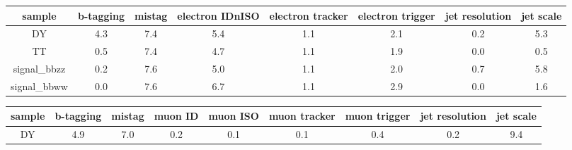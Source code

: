 




\begin{sidewaystable}
\begin{center}
\caption{Yield variations, ee channel, 300 GeV.}
\begin{tabular}{ | c | c | c | c | c | c |c | c | } \hline
 sample & b-tagging &  mistag &  electron IDnISO &  electron tracker &  electron trigger &  jet resolution &  jet scale \\\hline
  DY &              4.3 &     7.4 &              5.4 &               1.1 &               2.1 &             0.2 &        5.3 \\
  TT &              0.5 &     7.4 &              4.7 &               1.1 &               1.9 &             0.0 &        0.5 \\
  signal\_bbzz &    0.2 &     7.6 &              5.0 &               1.1 &               2.0 &             0.7 &        5.8 \\
  signal\_bbww &    0.0 &     7.6 &              6.7 &               1.1 &               2.9 &             0.0 &        1.6 \\\hline
\end{tabular}
\label{normalization_electron}
\end{center}
\begin{center}
\caption{Yield variations, mm channel, 300 GeV.}
\begin{tabular}{ | c | c | c | c| c | c | c | c| c |}\hline
sample &  b-tagging &  mistag &  muon ID &  muon ISO &  muon tracker &  muon trigger &  jet resolution &  jet scale \\\hline
  DY &              4.9 &     7.0 &      0.2 &       0.1 &           0.1 &           0.4 &             0.2 &        9.4 \\

\end{tabular}
\end{center}
\end{sidewaystable}

